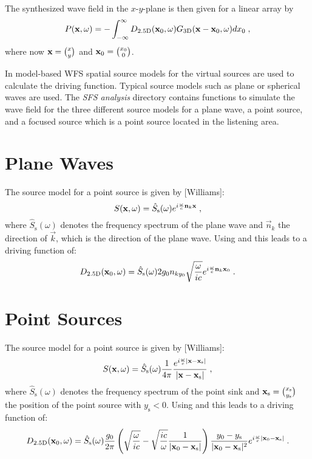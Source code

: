 \documentclass{article}
\begin{document}
The synthesized wave field in the $x$-$y$-plane is then given for a linear array
by
\begin{equation}
    P( \mathbf{x} ,\omega) = - \int^{\infty}_{-\infty} D_{\text{2.5D}}( \mathbf{x} _0,\omega)
    G_{\text{3D}}(  \mathbf{x} - \mathbf{x} _0 ,\omega) dx_0
    \;,
    \label{eq:P}
\end{equation}
where now $ \mathbf{x}  = \binom{x}{y}$ and $ \mathbf{x} _0 = \binom{x_0}{0}$.

In model-based WFS spatial
source models for the virtual sources are used to calculate the driving
function. Typical source models such as plane or spherical waves are used. The 
\textit{SFS analysis} directory contains functions to simulate the wave field
for the three different source models for a plane wave, a point source, and a
focused source which is a point source located in the listening area.


\section{Plane Waves}
The source model for a point source is given by [Williams]:
\begin{equation} 
    S( \mathbf{x} ,\omega) = 
    \hat{S}_\text{s}(\omega)
    e^{i \frac{\omega}{c}   \mathbf{n} _k  \mathbf{x} }
    \;,
\end{equation}
where $\hat{S}_\text{s}(\omega)$ denotes the frequency spectrum of the plane
wave and $\vec{n}_k$ the direction of $\vec{k}$, which is the direction of the
plane wave.
Using  and  this leads to a driving function of:
\begin{equation}
    D_{\text{2.5D}}( \mathbf{x} _0,\omega) = \hat{S}_\text{s}(\omega)
    2 g_0 n_{ky_0} \sqrt{\frac{\omega}{ic}}
    e^{i \frac{\omega}{c}   \mathbf{n} _k  \mathbf{x} _0}
    \;.
    \label{Dpw}
\end{equation}


\section{Point Sources}
The source model for a point source is given by [Williams]:
\begin{equation} 
    S( \mathbf{x} ,\omega) = 
    \hat{S}_\text{s}(\omega)
    \frac{1}{4\pi} \frac{e^{i \frac{\omega}{c} | \mathbf{x} - \mathbf{x} _\text{s}|}}{| \mathbf{x} - \mathbf{x} _\text{s}|}
    \;, 
\end{equation}
where $\hat{S}_\text{s}(\omega)$ denotes the frequency spectrum of the point
sink and $ \mathbf{x} _\text{s} = \binom{x_\text{s}}{y_\text{s}}$ the position of the
point source with $y_\text{s} < 0$.
Using  and  this leads to a driving function of:
\begin{equation}
    D_{\text{2.5D}}( \mathbf{x} _0,\omega) = \hat{S}_\text{s}(\omega)
    \frac{g_0}{2\pi}
    \left( \sqrt{\frac{\omega}{ic}} - \sqrt{\frac{ic}{\omega}} 
    \frac{1}{| \mathbf{x} _0- \mathbf{x} _\text{s}|} \right)
    \frac{y_0-y_\text{s}}{| \mathbf{x} _0- \mathbf{x} _\text{s}|^{2}} 
    e^{i \frac{\omega}{c} | \mathbf{x} _0- \mathbf{x} _\text{s}|}
    \;.
    \label{eq:Dps}
\end{equation}
\end{document}
